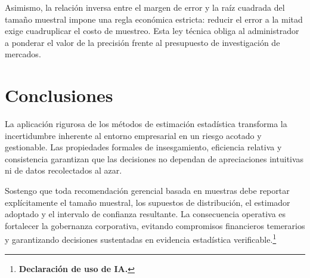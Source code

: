 {Asimismo, la relación inversa entre el margen de error y la raíz cuadrada del tamaño muestral impone una regla económica estricta: reducir el error a la mitad exige cuadruplicar el costo de muestreo. Esta ley técnica obliga al administrador a ponderar el valor de la precisión frente al presupuesto de investigación de mercados.

\section{Conclusiones}
La aplicación rigurosa de los métodos de estimación estadística transforma la incertidumbre inherente al entorno empresarial en un riesgo acotado y gestionable. Las propiedades formales de insesgamiento, eficiencia relativa y consistencia garantizan que las decisiones no dependan de apreciaciones intuitivas ni de datos recolectados al azar.

Sostengo que toda recomendación gerencial basada en muestras debe reportar explícitamente el tamaño muestral, los supuestos de distribución, el estimador adoptado y el intervalo de confianza resultante. La consecuencia operativa es fortalecer la gobernanza corporativa, evitando compromisos financieros temerarios y garantizando decisiones sustentadas en evidencia estadística verificable.\footnote{\textbf{Declaración de uso de IA.} \estadisticadeclaracionia}
}
\fi

